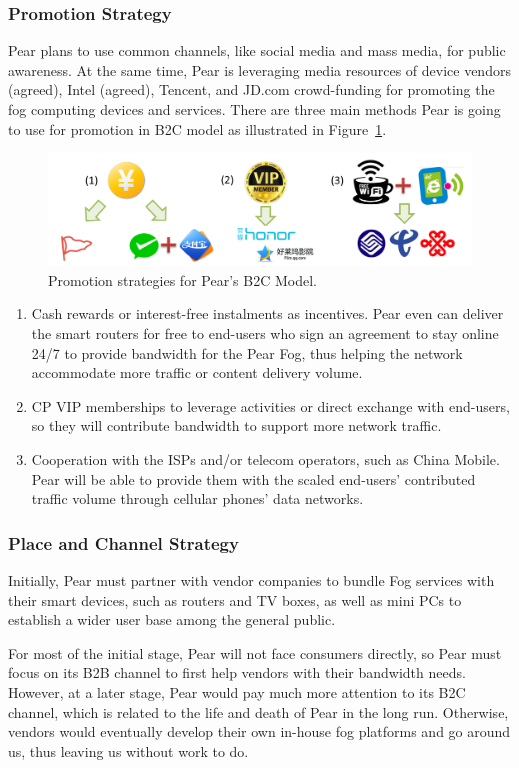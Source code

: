 \subsubsection{Promotion Strategy}
Pear plans to use common channels, like social media and mass media, for public awareness.
At the same time, Pear is leveraging media resources of device vendors (agreed), Intel (agreed), Tencent, and JD.com crowd-funding for promoting the fog computing devices and services. There are three main methods Pear is going to use for promotion in B2C model as illustrated in Figure~\ref{fig:promotion-strategy}.  
\begin{figure}[ht]
	\centering
	\includegraphics[width=.80\textwidth]{fig/biz/promotion_strategy.png}
	\caption{Promotion strategies for Pear's B2C Model.} \label{fig:promotion-strategy}
\end{figure}
\begin{enumerate}
	\item Cash rewards or interest-free instalments as incentives. Pear even can deliver the smart routers for free to end-users who sign an agreement to stay online 24/7 to provide bandwidth for the Pear Fog, thus helping the network accommodate more traffic or content delivery volume.
	\item CP VIP memberships to leverage activities or direct exchange with end-users, so they will contribute bandwidth to support more network traffic.
	\item Cooperation with the ISPs and/or telecom operators, such as China Mobile. Pear will be able to provide them with the scaled end-users' contributed traffic volume through cellular phones' data networks.
\end{enumerate}

\subsubsection{Place and Channel Strategy}
Initially, Pear must partner with vendor companies to bundle Fog services with their smart devices, such as routers and TV boxes, as well as mini PCs to establish a wider user base among the general public.

For most of the initial stage, Pear will not face consumers directly, so Pear must focus on its B2B channel to first help vendors with their bandwidth needs. However, at a later stage, Pear would pay much more attention to its B2C channel, which is related to the life and death of Pear in the long run. Otherwise, vendors would eventually develop their own in-house fog platforms and go around us, thus leaving us without work to do. 

